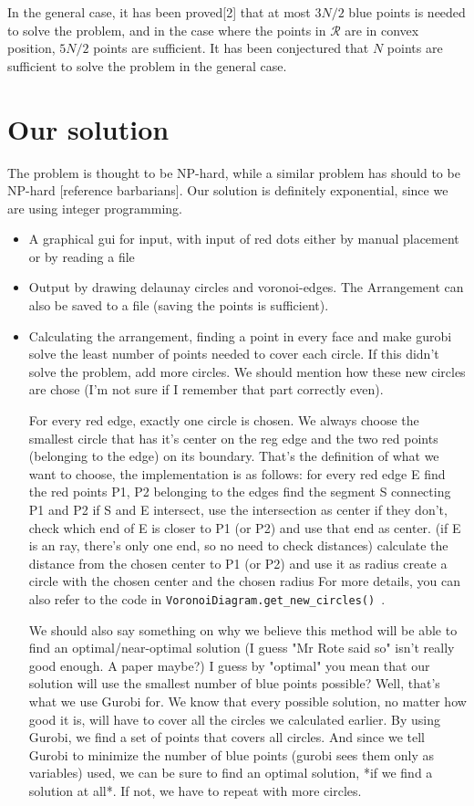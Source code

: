 \documentclass[a4paper,12pt]{article}
\begin{document}
In the general case, it has been proved[2] that at most $3N/2$ blue points is needed to solve the problem, and in the case where the points in  $\mathcal{R}$ are in convex position, $5N/2$ points are sufficient. It has been conjectured that $N$ points are sufficient to solve the problem in the general case.

\section{Our solution}
The problem is thought to be NP-hard, while a similar problem has should to be NP-hard [reference barbarians]. Our solution is definitely exponential, since we are using integer programming.

\begin{itemize}
\item
A graphical gui for input, with input of red dots either by manual placement or by reading a file
\item
Output by drawing delaunay circles and voronoi-edges.
The Arrangement can also be saved to a file (saving the points is sufficient).
\item
Calculating the arrangement, finding a point in every face and make gurobi solve the least number of points needed to cover each circle.
If this didn't solve the problem, add more circles. We should mention how these new circles are chose (I'm not sure if I remember that part correctly even). 

For every red edge, exactly one circle is chosen. We always choose the smallest circle that has it's center on the reg edge and the two red points (belonging to the edge) on its boundary.
That's the definition of what we want to choose, the implementation is as follows:
	for every red edge E {
		find the red points P1, P2 belonging to the edges
		find the segment S connecting P1 and P2
		if S and E intersect, use the intersection as center
		if they don't, check which end of E is closer to P1 (or P2) and use that end as center. (if E is an ray, there's only one end, so no need to check distances)
		calculate the distance from the chosen center to P1 (or P2) and use it as radius
		create a circle with the chosen center and the chosen radius
		}
For more details, you can also refer to the code in \texttt{VoronoiDiagram.get\_new\_circles() }.

We should also say something on why we believe this method will be able to find an optimal/near-optimal solution (I guess "Mr Rote said so" isn't really good enough. A paper maybe?)
I guess by "optimal" you mean that our solution will use the smallest number of blue points possible? Well, that's what we use Gurobi for. 
We know that every possible solution, no matter how good it is, will have to cover all the circles we calculated earlier.
By using Gurobi, we find a set of points that covers all circles. And since we tell Gurobi to minimize the number of blue points (gurobi sees them only as variables) used, we can be sure to find an optimal solution, *if we find a solution at all*. If not, we have to repeat with more circles.
\end{itemize}
\end{document}
